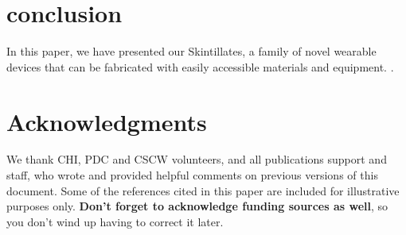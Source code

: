 \documentclass{sigchi}
\begin{document}
\section {conclusion}
In this paper, we have presented our Skintillates, a family of novel wearable devices that can be fabricated with easily accessible materials and equipment. 
 \cite{Kim:2015ii}.



\section{Acknowledgments}

We thank CHI, PDC and CSCW volunteers, and all publications support
and staff, who wrote and provided helpful comments on previous
versions of this document.  Some of the references cited in this paper
are included for illustrative purposes only.  \textbf{Don't forget
to acknowledge funding sources as well}, so you don't wind up
having to correct it later.

%
%
%
%
%
\balance



\end{document}
